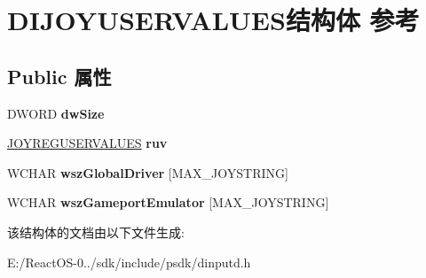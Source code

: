 \hypertarget{struct_d_i_j_o_y_u_s_e_r_v_a_l_u_e_s}{}\section{D\+I\+J\+O\+Y\+U\+S\+E\+R\+V\+A\+L\+U\+E\+S结构体 参考}
\label{struct_d_i_j_o_y_u_s_e_r_v_a_l_u_e_s}
\subsection*{Public 属性}
\begin{DoxyCompactItemize}
\item 
\mbox{\label{struct_d_i_j_o_y_u_s_e_r_v_a_l_u_e_s_a8a0b0f367d156ad5a913bc9483eee50f}} 
D\+W\+O\+RD {\bfseries dw\+Size}
\item 
\mbox{\label{struct_d_i_j_o_y_u_s_e_r_v_a_l_u_e_s_a990fcd1c30f6c468864e5cd47cdf36d8}} 
\hyperlink{structjoyreguservalues__tag}{J\+O\+Y\+R\+E\+G\+U\+S\+E\+R\+V\+A\+L\+U\+ES} {\bfseries ruv}
\item 
\mbox{\label{struct_d_i_j_o_y_u_s_e_r_v_a_l_u_e_s_ae3d5f71e0aa408b9c6d9a1187331e24d}} 
W\+C\+H\+AR {\bfseries wsz\+Global\+Driver} \mbox{[}M\+A\+X\+\_\+\+J\+O\+Y\+S\+T\+R\+I\+NG\mbox{]}
\item 
\mbox{\label{struct_d_i_j_o_y_u_s_e_r_v_a_l_u_e_s_a6257e955afc4d515d919bb4c53a93e8e}} 
W\+C\+H\+AR {\bfseries wsz\+Gameport\+Emulator} \mbox{[}M\+A\+X\+\_\+\+J\+O\+Y\+S\+T\+R\+I\+NG\mbox{]}
\end{DoxyCompactItemize}


该结构体的文档由以下文件生成\+:\begin{DoxyCompactItemize}
\item 
E\+:/\+React\+O\+S-\/0../sdk/include/psdk/dinputd.\+h\end{DoxyCompactItemize}
